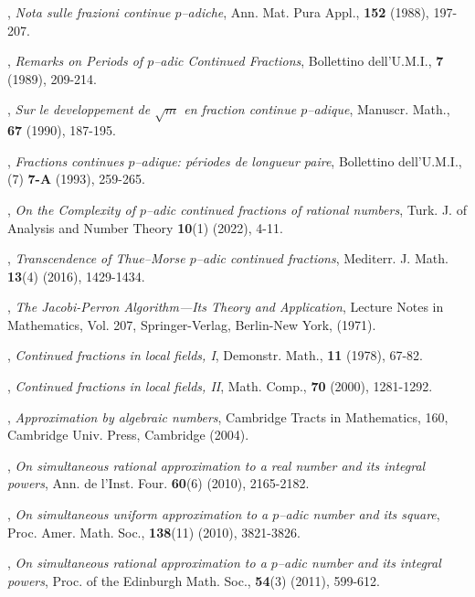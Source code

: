 \documentclass[12pt, reqno]{amsart}
\theoremstyle{plain}
\theoremstyle{definition}
\begin{document}
\begin{thebibliography}{}
,
\textit{Nota sulle frazioni continue $p$--adiche},
\newblock Ann. Mat. Pura Appl., \textbf{152} (1988), 197-207.

,
\textit{Remarks on Periods of $p$--adic Continued Fractions},
\newblock Bollettino dell'U.M.I., \textbf{7} (1989), 209-214.

,
\textit{Sur le developpement de $\sqrt{m}$ en fraction continue $p$--adique},
\newblock Manuscr. Math., \textbf{67} (1990), 187-195.

,
\textit{Fractions continues $p$--adique: périodes de longueur paire},
\newblock Bollettino dell'U.M.I., (7) \textbf{7-A} (1993), 259-265.

,
\textit{On the Complexity of $p$--adic continued fractions of rational numbers},
\newblock Turk. J. of Analysis and Number Theory \textbf{10}(1) (2022), 4-11.

,
\textit{Transcendence of Thue–Morse $p$--adic continued fractions},
\newblock Mediterr. J. Math. \textbf{13}(4) (2016), 1429-1434.

,
\textit{The Jacobi-Perron Algorithm—Its Theory and Application},
\newblock  Lecture Notes in
Mathematics, Vol. 207, Springer-Verlag, Berlin-New York, (1971).

,
\textit{Continued fractions in local fields, I},
\newblock Demonstr. Math., \textbf{11} (1978), 67-82.

,
\textit{Continued fractions in local fields, II},
\newblock Math. Comp., \textbf{70} (2000), 1281-1292.

,
\textit{Approximation by algebraic numbers},
\newblock Cambridge Tracts in Mathematics, 160, Cambridge Univ. Press, Cambridge (2004).


,
\textit{On simultaneous rational approximation to a real number and its integral powers},
\newblock Ann. de l'Inst. Four. \textbf{60}(6) (2010), 2165-2182.

,
\textit{On simultaneous uniform approximation to a $p$--adic number and its square},
\newblock Proc. Amer. Math. Soc., \textbf{138}(11) (2010), 3821-3826.

,
\textit{On simultaneous rational approximation to a $p$--adic number and its integral powers},
\newblock Proc. of the Edinburgh Math. Soc., \textbf{54}(3) (2011), 599-612.


\end{thebibliography}
\end{document}
